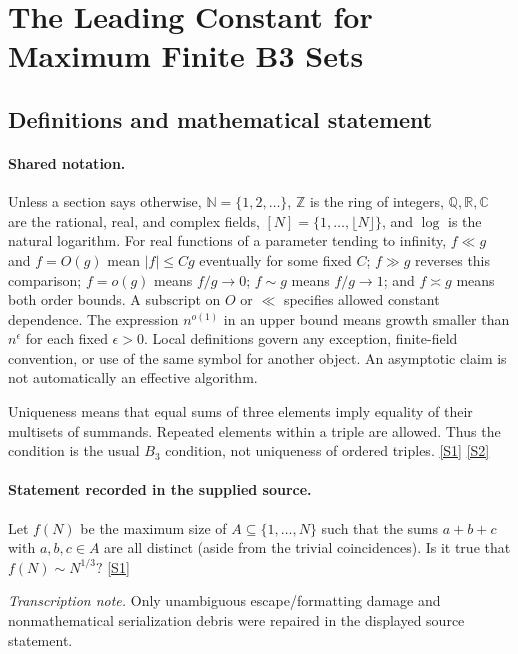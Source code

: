 \documentclass[11pt,a4paper]{article}
\newcommand{\N}{\mathbb{N}}
\newcommand{\Z}{\mathbb{Z}}
\newcommand{\Q}{\mathbb{Q}}
\newcommand{\R}{\mathbb{R}}
\newcommand{\C}{\mathbb{C}}
\newcommand{\sref}[2]{\hyperlink{source:#1:#2}{[S#2]}}
\begin{document}
\section{The Leading Constant for Maximum Finite B3 Sets}\label{statement}


\subsection{Definitions and mathematical statement}

\paragraph{Shared notation.}Unless a section says otherwise, $\N=\{1,2,\ldots\}$,
$\Z$ is the ring of integers, $\Q,\R,\C$ are the rational, real, and complex
fields, $[N]=\{1,\ldots,\lfloor N\rfloor\}$, and $\log$ is the natural
logarithm. For real functions of a parameter tending to infinity,
$f\ll g$ and $f=O(g)$ mean $|f|\leq Cg$ eventually for some fixed $C$;
$f\gg g$ reverses this comparison; $f=o(g)$ means $f/g\to0$;
$f\sim g$ means $f/g\to1$; and $f\asymp g$ means both order bounds.
A subscript on $O$ or $\ll$ specifies allowed constant dependence.
The expression $n^{o(1)}$ in an upper bound means growth smaller than
$n^\epsilon$ for each fixed $\epsilon>0$. Local definitions govern any
exception, finite-field convention, or use of the same symbol for another
object. An asymptotic claim is not automatically an effective algorithm.



Uniqueness means that equal sums of three elements imply equality of their multisets of summands. Repeated elements within a triple are allowed. Thus the condition is the usual $B_3$ condition, not uniqueness of ordered triples. \sref{statement}{1} \sref{statement}{2}

\paragraph{Statement recorded in the supplied source.}
Let $f(N)$ be the maximum size of $A\subseteq \{1,\ldots,N\}$ such that the sums $a+b+c$ with $a,b,c\in A$ are all distinct (aside from the trivial coincidences). Is it true that $  f(N)\sim N^{1/3}? $ \sref{statement}{1}

{\small\emph{Transcription note.} Only unambiguous escape/formatting damage and nonmathematical serialization debris were repaired in the displayed source statement.}
\end{document}
